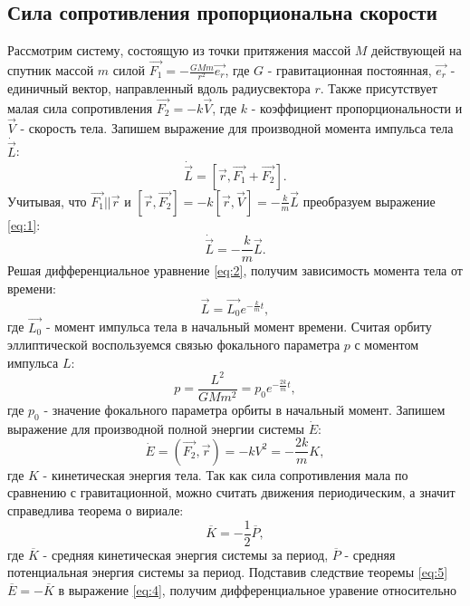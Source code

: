 \documentclass[12pt]{article}
\begin{document}
\subsection{Сила сопротивления пропорциональна скорости}
Рассмотрим систему, состоящую из точки притяжения массой $M$ действующей на спутник массой $m$ силой $\vec{F_1} = -\frac{GMm}{r^2}\vec{e_r}$, 
где $G$ - гравитационная постоянная, $\vec{e_r}$ - единичный вектор, направленный вдоль радиусвектора $r$. Также присутствует малая сила сопротивления
$\vec{F_2} = -k\vec{V}$, где $k$ - коэффициент пропорциональности и $\vec{V}$ - скорость тела. Запишем выражение для производной момента 
импульса тела $\dot{\vec{L}}$:
\begin{equation}\label{eq:1}
    \dot{\vec{L}} = [\vec{r}, \vec{F_1} + \vec{F_2}].
\end{equation}
Учитывая, что $\vec{F_1} || \vec{r}$ и $[\vec{r}, \vec{F_2}] = -k[\vec{r}, \vec{V}] = -\frac{k}{m}\vec{L}$ преобразуем выражение \ref{eq:1}:
\begin{equation}\label{eq:2}
    \dot{\vec{L}} = -\frac{k}{m}\vec{L}.
\end{equation}
Решая дифференциальное уравнение \ref{eq:2}, получим зависимость момента тела от времени:
\begin{equation}\label{eq:3}
    \vec{L} = \vec{L_0}e^{-\frac{k}{m}t},
\end{equation}
где $\vec{L_0}$ - момент импульса тела в начальный момент времени. Считая орбиту эллиптической воспользуемся связью фокального параметра $p$ 
с моментом импульса $L$:
\begin{equation}\label{eq:9}
    p = \frac{L^2}{GMm^2} = p_0e^{-\frac{2k}{m}t},
\end{equation}
где $p_0$ - значение фокального параметра орбиты в начальный момент.
Запишем выражение для производной полной энергии системы $\dot{E}$:
\begin{equation}\label{eq:4}
    \dot{E} = (\vec{F_2}, \vec{r}) = -kV^2 = -\frac{2k}{m}K,
\end{equation}
где $K$ - кинетическая энергия тела. 
Так как сила сопротивления мала по сравнению с гравитационной, можно считать движения периодическим, а значит справедлива теорема о вириале:
\begin{equation}\label{eq:5}
    \overline{K} = -\frac{1}{2}\overline{P},
\end{equation}
где $\overline{K}$ - средняя кинетическая энергия системы за период, $\overline{P}$ - средняя потенциальная энергия системы за период.
Подставив следствие теоремы \ref{eq:5} $\overline{E} = -\overline{K}$ в выражение \ref{eq:4}, получим дифференциальное уравение относительно
\end{document}
